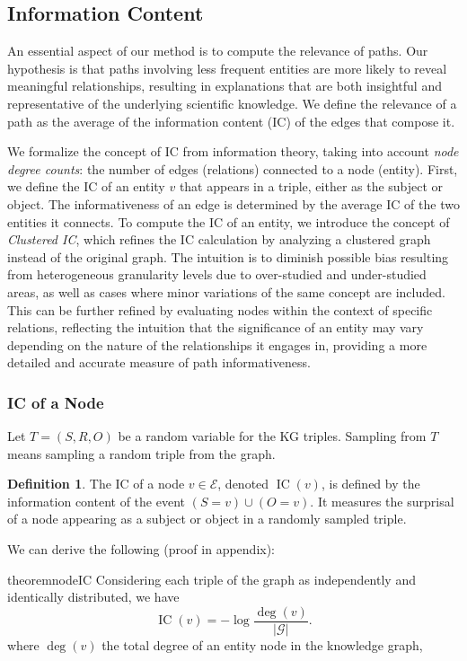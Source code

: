 \documentclass{article}
\theoremstyle{definition}
\newtheorem{definition}{Definition}
\DeclareMathOperator{\IC}{IC}
\DeclareMathOperator{\degree}{deg}
\newcommand{\G}{\mathcal{G}}
\begin{document}
\subsection{Information Content}
An essential aspect of our method is to compute the relevance of paths. Our hypothesis is that paths involving less frequent entities are more likely to reveal meaningful relationships, resulting in explanations that are both insightful and representative of the underlying scientific knowledge. We define the relevance of a path as the average of the information content (IC) of the edges that compose it.

We formalize the concept of IC from information theory, taking into account \textit{node degree counts}: the number of edges (relations) connected to a node (entity). First, we define the IC of an entity $v$ that appears in a triple, either as the subject or object. The informativeness of an edge is determined by the average IC of the two entities it connects. To compute the IC of an entity, we introduce the concept of \textit{Clustered IC}, which refines the IC calculation by analyzing a clustered graph instead of the original graph. The intuition is to diminish possible bias resulting from heterogeneous granularity levels due to over-studied and under-studied areas, as well as cases where minor variations of the same concept are included. This can be further refined by evaluating nodes within the context of specific relations, reflecting the intuition that the significance of an entity may vary depending on the nature of the relationships it engages in, providing a more detailed and accurate measure of path informativeness.

\subsubsection{IC of a Node}
Let $T = (S,R,O)$ be a random variable for the KG triples. Sampling from $T$ means sampling a random triple from the graph. 

\begin{definition}
   The IC of a node $v \in \mathcal{E}$, denoted $\IC(v)$, is defined by the information content of the event $(S=v) \cup (O=v)$. It measures the surprisal of a node appearing as a subject or object in a randomly sampled triple.
\end{definition}

We can derive the following (proof in appendix):
\begin{restatable}{theorem}{nodeIC}
    \label{thm:nodeIC}
    Considering each triple of the graph as independently and identically distributed, we have
    \begin{equation}
        \IC(v) = -\log \frac{\degree(v)}{|\G|}.
    \end{equation}
    where $\degree(v)$ the total degree of an entity node in the knowledge graph,
\end{restatable}
\end{document}
